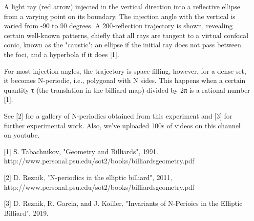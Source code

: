 A light ray (red arrow) injected in the vertical direction into a reflective ellipse from a varying point on its boundary. The injection angle with the vertical is varied from -90 to 90 degrees. A 200-reflection trajectory is shown, revealing certain well-known patterns, chiefly that all rays are tangent to a virtual confocal conic, known as the "caustic": an ellipse if the initial ray does not pass between the foci, and a hyperbola if it does [1].

For most injection angles, the trajectory is space-filling, however, for a dense set, it becomes N-periodic, i.e., polygonal with N sides. This happens when a certain quantity τ (the translation in the billiard map) divided by 2π is a rational number [1].

See [2] for a gallery of N-periodics obtained from this experiment and [3] for further experimental work. Also, we've uploaded 100s of videos on this channel on youtube.

[1] S. Tabachnikov, "Geometry and Billiards", 1991. http://www.personal.psu.edu/sot2/books/billiardsgeometry.pdf

[2] D. Reznik, "N-periodics in the elliptic billiard", 2011, http://www.personal.psu.edu/sot2/books/billiardsgeometry.pdf

[3] D. Reznik, R. Garcia, and J. Koiller, "Invariants of N-Perioics in the Elliptic Billiard", 2019.